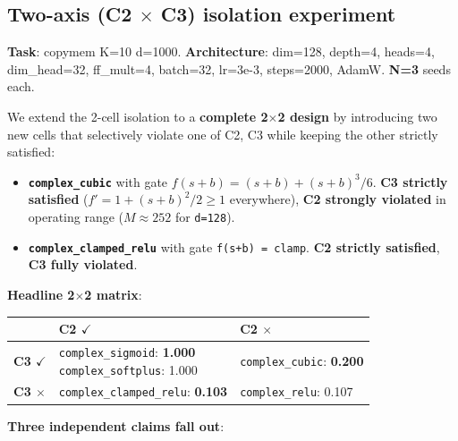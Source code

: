 \documentclass[11pt,a4paper]{article}
\theoremstyle{plain}
\theoremstyle{definition}
\begin{document}
\subsection{Two-axis (C2 $\times$ C3) isolation experiment}
\textbf{Task}: copymem K=10 d=1000. \textbf{Architecture}: dim=128, depth=4, heads=4, dim\_head=32, ff\_mult=4, batch=32, lr=3e-3, steps=2000, AdamW. \textbf{N=3} seeds each.

We extend the 2-cell isolation to a \textbf{complete 2$\times$2 design} by introducing two new cells that selectively violate one of {C2, C3} while keeping the other strictly satisfied:

\begin{itemize}
  \item \textbf{\texttt{complex\_cubic}} with gate $f(s+b) = (s+b) + (s+b)^3/6$. \textbf{C3 strictly satisfied} ($f' = 1 + (s+b)^2/2 \ge  1$ everywhere), \textbf{C2 strongly violated} in operating range ($M \approx  252$ for \texttt{d=128}).
  \item \textbf{\texttt{complex\_clamped\_relu}} with gate \texttt{f(s+b) = clamp}. \textbf{C2 strictly satisfied}, \textbf{C3 fully violated}.
\end{itemize}

\textbf{Headline 2$\times$2 matrix}:

\begin{table}[H]
\centering
\begin{minipage}{0.53\textwidth}
\centering
\footnotesize
\setlength{\tabcolsep}{4pt}
\renewcommand{\arraystretch}{1.1}
\begin{tabular}{|l|l|l|}
\hline
 & \textbf{C2 $\checkmark$} & \textbf{C2 $\times$} \\
\hline
\textbf{C3 $\checkmark$} & \makecell[l]{\texttt{complex\_sigmoid}: \textbf{1.000} \\ \texttt{complex\_softplus}: 1.000} & \texttt{complex\_cubic}: \textbf{0.200} \\
\hline
\textbf{C3 $\times$} & \texttt{complex\_clamped\_relu}: \textbf{0.103} & \texttt{complex\_relu}: 0.107 \\
\hline
\end{tabular}
\end{minipage}
\end{table}

\textbf{Three independent claims fall out}:
\end{document}
